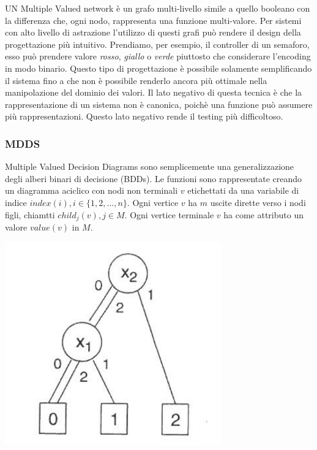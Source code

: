 \documentclass[
]{book}
\begin{document}
UN Multiple Valued network è un grafo multi-livello simile a quello booleano con la differenza che, ogni nodo, rappresenta una funzione multi-valore. Per sistemi con alto livello di astrazione l'utilizzo di questi grafi può rendere il design della progettazione più intuitivo. Prendiamo, per esempio, il controller di un semaforo, esso può prendere valore \emph{rosso}, \emph{giallo} o \emph{verde} piuttosto che considerare l'encoding in modo binario. Questo tipo di progettazione è possibile solamente semplificando il sistema fino a che non è possibile renderlo ancora più ottimale nella manipolazione del dominio dei valori. Il lato negativo di questa tecnica è che la rappresentazione di un sistema non è canonica, poichè una funzione può assumere più rappresentazioni. Questo lato negativo rende il testing più difficoltoso.

\newpage

\hypertarget{mdds}{%
\subsubsection{MDDS}\label{mdds}}

Multiple Valued Decision Diagrams sono semplicemente una generalizzazione degli alberi binari di decisione (BDDs). Le funzioni sono rappresentate creando un diagramma aciclico con nodi non terminali \(v\) etichettati da una variabile di indice \(index(i), i \in \{1,2,...,n\}\). Ogni vertice \(v\) ha \(m\) uscite dirette verso i nodi figli, chiamtti \(child_j(v), j \in M\). Ogni vertice terminale \(v\) ha come attributo un valore \(value(v)\) in \(M\).

\includegraphics[width=0.7\textwidth,height=\textheight]{./media/04.png}
\end{document}
